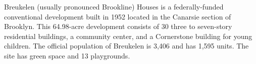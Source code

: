 Breukelen (usually pronounced Brookline) Houses is a federally-funded conventional development built in 1952 located in the Canarsie section of Brooklyn. This 64.98-acre development consists of 30 three to seven-story residential buildings, a community center, and a Cornerstone building for young children. The official population of Breukelen is 3,406 and has 1,595 units. The site has green space and 13 playgrounds.